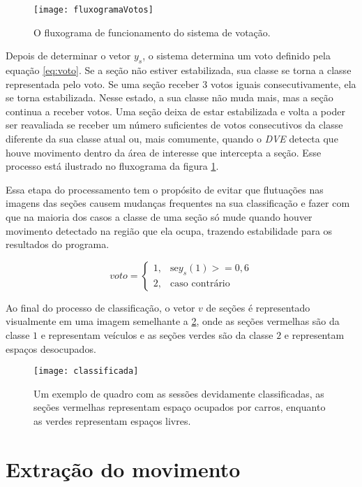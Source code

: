 \begin{figure}
	\centering
	\texttt{[image: fluxogramaVotos]}
	\label{fig:fluxogramaVotos}
	\caption{O fluxograma de funcionamento do sistema de votação.}
	\centering
\end{figure}


Depois de determinar o vetor $y_s$, o sistema determina um voto definido pela equação \ref{eq:voto}.  Se a seção não estiver estabilizada, sua classe se torna a classe representada pelo voto. Se uma seção receber $3$ votos iguais consecutivamente, ela se torna estabilizada. Nesse estado, a sua classe não muda mais, mas a seção continua a receber votos. Uma seção deixa de estar estabilizada e volta a poder ser reavaliada se receber um número suficientes de votos consecutivos da classe diferente da sua classe atual ou, mais comumente, quando o \textit{DVE} detecta que houve movimento dentro da área de interesse que intercepta a seção. Esse processo está ilustrado no fluxograma da figura \ref{fig:fluxogramaVotos}.

Essa etapa do processamento tem o propósito de evitar que flutuações nas imagens das seções causem mudanças frequentes na sua classificação e fazer com que na maioria dos casos a classe de uma seção só mude quando houver movimento detectado na região que ela ocupa, trazendo estabilidade para os resultados do programa.

\begin{equation}
voto= 
\begin{cases}
    1,& \text{se} y_s(1) >= 0,6\\
    2,& \text{caso contrário}
\end{cases}
\label{eq:voto}
\end{equation}


Ao final do processo de classificação, o vetor $v$ de seções é representado visualmente em uma imagem semelhante a \ref{fig:exemploClassificacao}, onde as seções vermelhas são da classe $1$ e representam veículos e as seções verdes são da classe $2$ e representam espaços desocupados.

\begin{figure}
\centering
\texttt{[image: classificada]}
\centering
\caption{Um exemplo de quadro com as sessões devidamente classificadas, as seções vermelhas representam espaço ocupados por carros, enquanto as verdes representam espaços livres.}
\label{fig:exemploClassificacao}
\end{figure}

\section{Extração do movimento}

